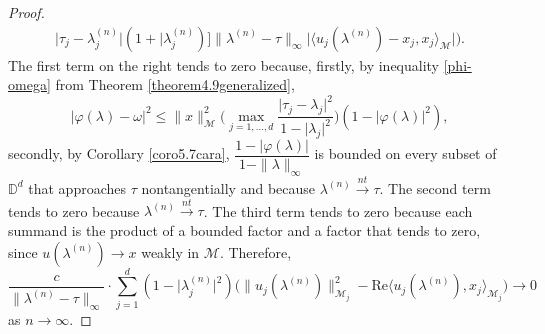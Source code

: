 \documentclass[10pt,a4paper]{amsart}
\begin{document}
\begin{proof}
\begin{align}
{{\lvert \tau_{j}-\lambda^{(n)}_{j}\rvert}{(1+\lvert\lambda^{(n)}_{j})}
\Big]}{\|\lambda^{(n)}-\tau\|_{\infty}}\lvert\langle u_{j}(\lambda^{(n)})-x_{j},x_{j}\rangle_{\mathcal{M}}\rvert \Bigg).
\end{align} 
The first term on the right tends to zero because, firstly, by inequality \eqref{phi-omega} from Theorem \ref{theorem4.9generalized},
\begin{equation}\label{phi-omega-2}
 \lvert \varphi(\lambda)-\omega\rvert^{2} \leq  \|x\|_{\mathcal{M}}^{2}\bigg(\max_{j=1,\hdots,d}\dfrac{\lvert \tau_{j}-\lambda_{j}\rvert^{2}}{1-\lvert \lambda_{j}\rvert^{2}}\bigg)(1-\lvert \varphi(\lambda) \rvert^{2}),
\end{equation}
 secondly, by Corollary \ref{coro5.7cara},   $\dfrac{1-\lvert \varphi(\lambda) \rvert}{1-\|\lambda\|_{\infty}}$ is bounded on every subset of $\mathbb{D}^{d}$ that approaches $\tau$ nontangentially and because $\lambda^{(n)}{\overset{nt}\rightarrow}\tau$. 
The second term tends to zero because $\lambda^{(n)}{\overset{nt}\rightarrow}\tau$. The third term tends to zero because
each summand is the product of a bounded factor and a factor that tends to zero, since $u(\lambda^{(n)})\rightarrow x$ weakly in $\mathcal{M}$. Therefore,
\begin{equation}\label{equation5272}
 \dfrac{c}{\|\lambda^{(n)}-\tau\|_{\infty}}\cdot\sum_{j=1}^{d}(1-\lvert \lambda^{(n)}_{j} \rvert^{2})\Big(\|u_{j}(\lambda^{(n)})\|_{\mathcal{M}_{j}}^{2}-\mathrm{Re} \langle u_{j}(\lambda^{(n)}),x_{j}\rangle_{\mathcal{M}_{j}} \Big) \to 0
\end{equation}
as $n \rightarrow  \infty$.


\end{proof}
\end{document}
